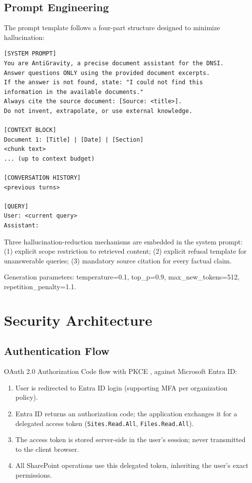 \subsection{Prompt Engineering}
\label{subsec:prompt-engineering}

The prompt template follows a four-part structure designed to minimize hallucination:

\begin{verbatim}
[SYSTEM PROMPT]
You are AntiGravity, a precise document assistant for the DNSI.
Answer questions ONLY using the provided document excerpts.
If the answer is not found, state: "I could not find this
information in the available documents."
Always cite the source document: [Source: <title>].
Do not invent, extrapolate, or use external knowledge.

[CONTEXT BLOCK]
Document 1: [Title] | [Date] | [Section]
<chunk text>
... (up to context budget)

[CONVERSATION HISTORY]
<previous turns>

[QUERY]
User: <current query>
Assistant:
\end{verbatim}

Three hallucination-reduction mechanisms are embedded in the system prompt: (1) explicit scope restriction to retrieved content; (2) explicit refusal template for unanswerable queries; (3) mandatory source citation for every factual claim.

Generation parameters: temperature=0.1, top\_p=0.9, max\_new\_tokens=512, repetition\_penalty=1.1.

\section{Security Architecture}
\label{sec:arch-security}

\subsection{Authentication Flow}

OAuth 2.0 Authorization Code flow \citep{RFC6749} with PKCE \citep{RFC7636}, against Microsoft Entra ID:
\begin{enumerate}
  \item User is redirected to Entra ID login (supporting MFA per organization policy).
  \item Entra ID returns an authorization code; the application exchanges it for a delegated access token (\texttt{Sites.Read.All}, \texttt{Files.Read.All}).
  \item The access token is stored server-side in the user's session; never transmitted to the client browser.
  \item All SharePoint operations use this delegated token, inheriting the user's exact permissions.
\end{enumerate}

